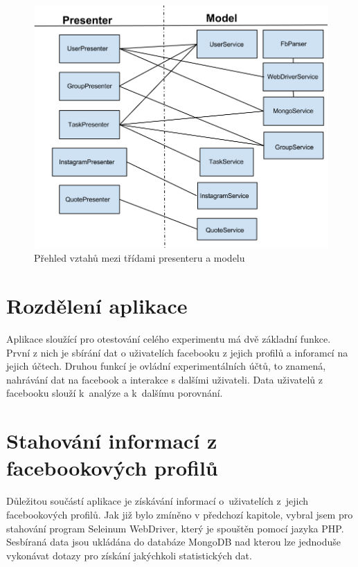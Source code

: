 \documentclass[thesis=M,czech]{FITthesis}[2013/05/10]
\begin{document}
\begin{figure}[h]
\begin{center}
\includegraphics[width=5in]{figures/fcModelPresenter.png}
\caption{Přehled vztahů mezi třídami presenteru a modelu}
\label{fig:fcModelPresenter}
\end{center}
\end{figure}

\section{Rozdělení aplikace}

Aplikace sloužící pro otestování celého experimentu má dvě základní funkce. První z nich je sbírání dat o uživatelích facebooku z jejich profilů a inforamcí na jejich účtech. Druhou funkcí je ovládní experimentálních účtů, to znamená, nahrávání dat na facebook a interakce s dalšími uživateli. Data uživatelů z facebooku slouží k~analýze a k~dalšímu porovnání.

\section{Stahování informací z facebookových profilů}

Důležitou součástí aplikace je získávání informací o~uživatelích z~jejich facebookových profilů. Jak již bylo zmíněno v předchozí kapitole, vybral jsem pro stahování program Seleinum WebDriver, který je spouštěn pomocí jazyka PHP. Sesbíraná data jsou ukládána do databáze MongoDB nad kterou lze jednoduše vykonávat dotazy pro získání jakýchkoli statistických dat.
\end{document}
